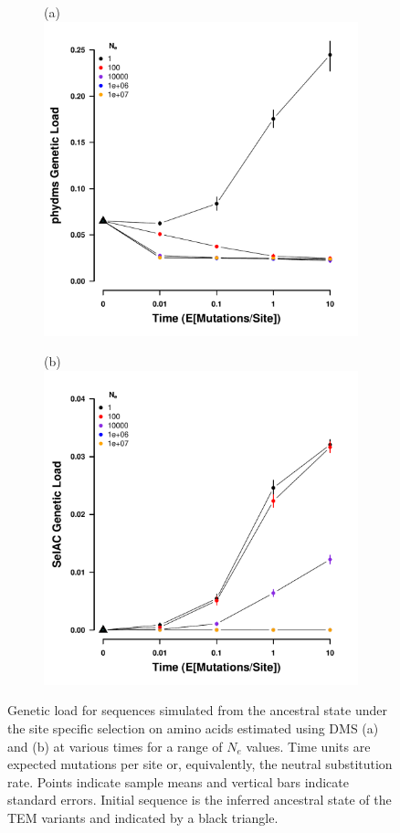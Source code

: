 \documentclass[fleqn,letterpaper]{article}
\begin{document}
\begin{figure}
    \centering
    \begin{subfigure}
        \centering
        (a)\includegraphics[width=.45\textwidth]{img/simulated_gl_time_DMS_ancest.pdf}
    \end{subfigure}
    \begin{subfigure}
        \centering
        (b)\includegraphics[width=.45\textwidth]{img/simulated_gl_time_SELAC_ancest.pdf}
    \end{subfigure}
    \caption{Genetic load for sequences simulated from the ancestral state under the site specific selection on amino acids estimated using DMS (a) and \selac (b) at various times for a range of $N_e$ values.
    Time units are expected mutations per site or, equivalently, the neutral substitution rate.
    Points indicate sample means and vertical bars indicate standard errors. Initial sequence is the inferred ancestral state of the TEM variants and indicated by a black triangle.}
    \label{fig:gl_sim}
\end{figure}

\clearpage
\end{document}
